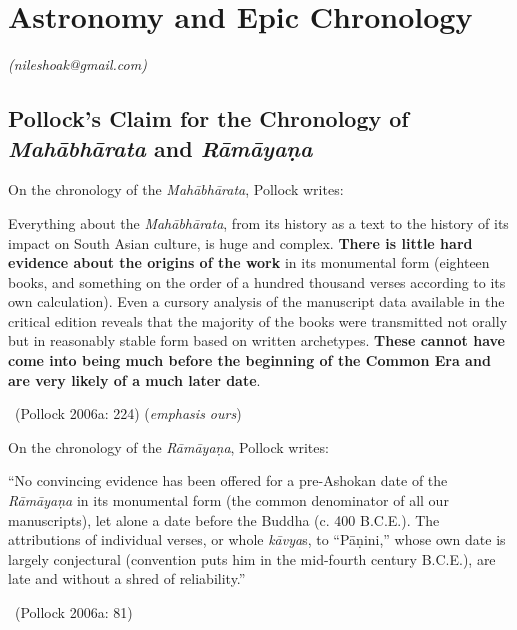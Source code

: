 
\chapter{Astronomy and Epic Chronology}\label{chapter2}



\begin{flushright}
\textit{(nileshoak@gmail.com)}
\end{flushright}


\section*{Pollock’s Claim for the Chronology \hfill\break of \textit{Mahābhārata} and \textit{Rāmāyaṇa} }

On the chronology of the \textit{Mahābhārata}, Pollock writes:

\begin{myquote}
Everything about the \textit{Mahābhārata}, from its history as a text to the history of its impact on South Asian culture, is huge and complex. \textbf{There is little hard evidence about the origins of the work} in its monumental form (eighteen books, and something on the order of a hundred thousand verses according to its own calculation). Even a cursory analysis of the manuscript data available in the critical edition reveals that the majority of the books were transmitted not orally but in reasonably stable form based on written archetypes.\textbf{ These cannot have come into being much before the beginning of the Common Era and are very likely of a much later date}. 

~\hfill (Pollock 2006a: 224) (\textit{emphasis ours})
\end{myquote}

On the chronology of the \textit{Rāmāyaṇa}, Pollock writes:

\begin{myquote}
“No convincing evidence has been offered for a pre-Ashokan date of the \textit{Rāmāyaṇa} in its monumental form (the common denominator of all our manuscripts), let alone a date before the Buddha (c. 400 B.C.E.). The attributions of individual verses, or whole \textit{kāvya}s, to “Pāṇini,” whose own date is largely conjectural (convention puts him in the mid-fourth century B.C.E.), are late and without a shred of reliability.” 

~\hfill (Pollock 2006a: 81)
\end{myquote}

